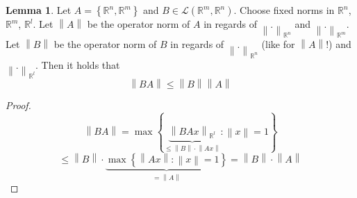 \documentclass[a4paper,landscape,twocolumn]{article}
\theoremstyle{definition}
\newtheorem{lemma}{Lemma}
\newcommand\set[1]{\left\{#1\right\}}
\newcommand\norm[1]{\left\|#1\right\|}
\begin{document}
\begin{lemma}
  Let $A = \set{\mathbb R^n, \mathbb R^m}$ and $B \in \mathcal{L}(\mathbb R^m, \mathbb R^n)$.
  Choose fixed norms in $\mathbb R^n$, $\mathbb R^m$, $\mathbb R^l$.
  Let $\norm{A}$ be the operator norm of $A$ in regards of $\norm{.}_{\mathbb R^n}$ and $\norm{.}_{\mathbb R^m}$.
  Let $\norm{B}$ be the operator norm of $B$ in regards of $\norm{.}_{\mathbb R^n}$ (like for $\norm{A}$!) and $\norm{.}_{\mathbb R^l}$.
  Then it holds that
  \[ \norm{BA} \leq \norm{B} \norm{A} \]
\end{lemma}
\begin{proof}
  \[ \norm{BA} = \max\set{\underbrace{\norm{BAx}_{\mathbb R^l}}_{\leq \norm{B} \cdot \norm{Ax}}: \norm{x} = 1} \]
  \[ \leq \norm{B} \cdot \underbrace{\max\set{\norm{Ax}: \norm{x} = 1}}_{= \norm{A}} = \norm{B} \cdot \norm{A} \]
\end{proof}
\end{document}
